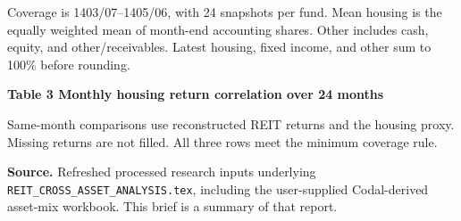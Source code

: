 \documentclass[11pt,a4paper]{article}
\begin{document}
{\small Coverage is 1403/07--1405/06, with 24 snapshots per fund. Mean housing is the equally weighted mean of month-end accounting shares. Other includes cash, equity, and other/receivables. Latest housing, fixed income, and other sum to 100\% before rounding.}\par

\textbf{Table 3 Monthly housing return correlation over 24 months}

\begin{center}
\small
{}
\end{center}

{\small Same-month comparisons use reconstructed REIT returns and the housing proxy. Missing returns are not filled. All three rows meet the minimum coverage rule.}\par

\textbf{Source.} Refreshed processed research inputs underlying \texttt{REIT\_CROSS\_ASSET\_ANALYSIS.tex}, including the user-supplied Codal-derived asset-mix workbook. This brief is a summary of that report.
\end{document}
